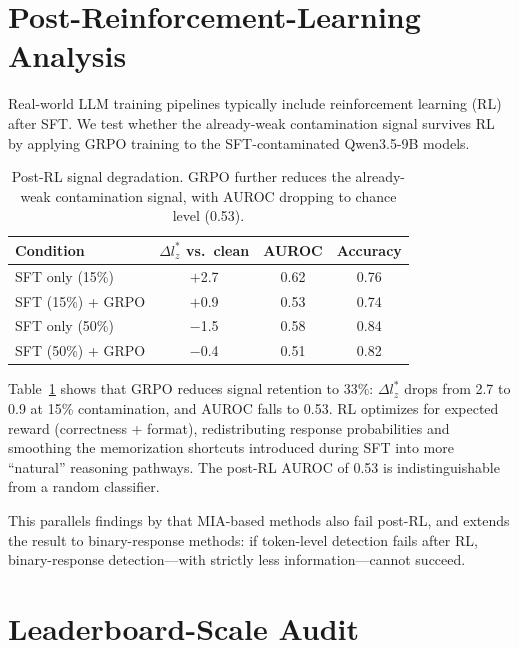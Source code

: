 \documentclass[11pt]{article}
\begin{document}
\section{Post-Reinforcement-Learning Analysis}
\label{sec:post-rl}

Real-world LLM training pipelines typically include reinforcement learning (RL) after SFT.
We test whether the already-weak contamination signal survives RL by applying GRPO training to the SFT-contaminated Qwen3.5-9B models.

\begin{table}[t]
\centering
\caption{Post-RL signal degradation. GRPO further reduces the already-weak contamination signal, with AUROC dropping to chance level (0.53).}
\label{tab:post-rl}
\begin{tabular}{lccc}
\toprule
Condition & $\Delta l_z^*$ vs.\ clean & AUROC & Accuracy \\
\midrule
SFT only (15\%)       & $+$2.7  & 0.62 & 0.76 \\
SFT (15\%) + GRPO     & $+$0.9  & 0.53 & 0.74 \\
SFT only (50\%)       & $-$1.5  & 0.58 & 0.84 \\
SFT (50\%) + GRPO     & $-$0.4  & 0.51 & 0.82 \\
\bottomrule
\end{tabular}
\end{table}

Table~\ref{tab:post-rl} shows that GRPO reduces signal retention to 33\%: $\Delta l_z^*$ drops from 2.7 to 0.9 at 15\% contamination, and AUROC falls to 0.53.
RL optimizes for expected reward (correctness + format), redistributing response probabilities and smoothing the memorization shortcuts introduced during SFT into more ``natural'' reasoning pathways.
The post-RL AUROC of 0.53 is indistinguishable from a random classifier.

This parallels findings by \citet{wang2025mia} that MIA-based methods also fail post-RL, and extends the result to binary-response methods: if token-level detection fails after RL, binary-response detection---with strictly less information---cannot succeed.

\section{Leaderboard-Scale Audit}
\label{sec:leaderboard}
\end{document}
